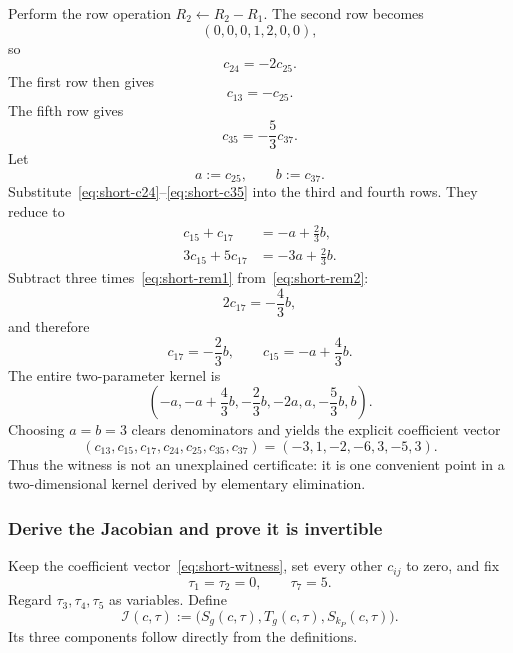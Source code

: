 \documentclass[11pt]{article}
\theoremstyle{definition}
\begin{document}
Perform the row operation $R_2\leftarrow R_2-R_1$.  The second row becomes
\[
(0,0,0,1,2,0,0),
\]
so
\begin{equation}
c_{24}=-2c_{25}.
\label{eq:short-c24}
\end{equation}
The first row then gives
\begin{equation}
c_{13}=-c_{25}.
\label{eq:short-c13}
\end{equation}
The fifth row gives
\begin{equation}
c_{35}=-\frac53c_{37}.
\label{eq:short-c35}
\end{equation}
Let
\[
a:=c_{25},
\qquad
b:=c_{37}.
\]
Substitute~\eqref{eq:short-c24}--\eqref{eq:short-c35} into the third and fourth rows.  They reduce to
\begin{align}
c_{15}+c_{17}&=-a+\frac23b,\label{eq:short-rem1}\\
3c_{15}+5c_{17}&=-3a+\frac23b.\label{eq:short-rem2}
\end{align}
Subtract three times~\eqref{eq:short-rem1} from~\eqref{eq:short-rem2}:
\[
2c_{17}=-\frac43b,
\]
and therefore
\begin{equation}
c_{17}=-\frac23b,
\qquad
c_{15}=-a+\frac43b.
\label{eq:short-c15-c17}
\end{equation}
The entire two-parameter kernel is
\begin{equation}
\left(
-a,
-a+\frac43b,
-\frac23b,
-2a,
a,
-\frac53b,
b
\right).
\label{eq:short-kernel}
\end{equation}
Choosing $a=b=3$ clears denominators and yields the explicit coefficient vector
\begin{equation}
\boxed{
(c_{13},c_{15},c_{17},c_{24},c_{25},c_{35},c_{37})
=(-3,1,-2,-6,3,-5,3).
}
\label{eq:short-witness}
\end{equation}
Thus the witness is not an unexplained certificate: it is one convenient point in a two-dimensional kernel derived by elementary elimination.

\subsubsection{Derive the Jacobian and prove it is invertible}

Keep the coefficient vector~\eqref{eq:short-witness}, set every other $c_{ij}$ to zero, and fix
\[
\tau_1=\tau_2=0,
\qquad
\tau_7=5.
\]
Regard $\tau_3,\tau_4,\tau_5$ as variables.  Define
\begin{equation}
\mathcal I(c,\tau)
:=
\bigl(S_g(c,\tau),T_g(c,\tau),S_{k_P}(c,\tau)\bigr).
\label{eq:I-short}
\end{equation}
Its three components follow directly from the definitions.
\end{document}
